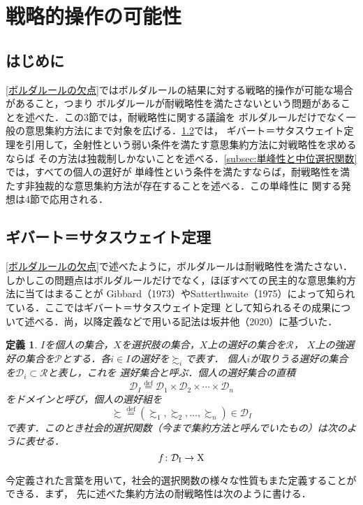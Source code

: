 \documentclass[dvipdfmx]{jsarticle}
\newtheorem*{DEfinition}{定義}
\begin{document}
\section{戦略的操作の可能性}
\subsection{はじめに}
\ref{ボルダルールの欠点}ではボルダルールの結果に対する戦略的操作が可能な場合があること，つまり
ボルダルールが耐戦略性を満たさないという問題があることを述べた．この3節では，耐戦略性に関する議論を
ボルダルールだけでなく一般の意思集約方法にまで対象を広げる．\ref{subsec:ギバート＝サタスウェイト定理}では，
ギバート＝サタスウェイト定理を引用して，全射性という弱い条件を満たす意思集約方法に対戦略性を求めるならば
その方法は独裁制しかないことを述べる．\ref{subsec:単峰性と中位選択関数}では，すべての個人の選好が
単峰性という条件を満たすならば，耐戦略性を満たす非独裁的な意思集約方法が存在することを述べる．この単峰性に
関する発想は4節で応用される．

\subsection{ギバート＝サタスウェイト定理}\label{subsec:ギバート＝サタスウェイト定理}
\ref{ボルダルールの欠点}で述べたように，ボルダルールは耐戦略性を満たさない．
しかしこの問題点はボルダルールだけでなく，ほぼすべての民主的な意思集約方法に当てはまることが
Gibbard（1973）やSatterthwaite（1975）によって知られている．ここではギバート＝サタスウェイト定理
として知られるその成果について述べる．尚，以降定義などで用いる記法は坂井他（2020）に基づいた．

\begin{DEfinition}
  $I$を個人の集合，$X$を選択肢の集合，$X$上の選好の集合を$\mathcal{R}$，
  $X$上の強選好の集合を$\mathcal{P}$とする．各$i \in I$の選好を$\succsim_i$で表す．
  個人$i$が取りうる選好の集合を$\mathcal{D}_i \subset \mathcal{R}$と表し，これを
  選好集合と呼ぶ．個人の選好集合の直積
  \[
    \mathcal{D}_I \stackrel{\mathrm{def}}{=} \mathcal{D}_1 \times
    \mathcal{D}_2 \times \cdots \times \mathcal{D}_n
  \]
  をドメインと呼び，個人の選好組を
  \[
    \succsim \stackrel{\mathrm{def}}{=} (\succsim_1, \succsim_2, \ldots, \succsim_n)
      \in \mathcal{D}_I
  \]
  で表す．このとき社会的選択関数（今まで集約方法と呼んでいたもの）は次のように表せる．
  \[
    {\mathnormal{f}}\colon \mathcal{D}_{\mathrm{I}} \to \mathrm{X}
  \]
\end{DEfinition}

今定義された言葉を用いて，社会的選択関数の様々な性質もまた定義することができる．まず，
先に述べた集約方法の耐戦略性は次のように書ける．
\end{document}
